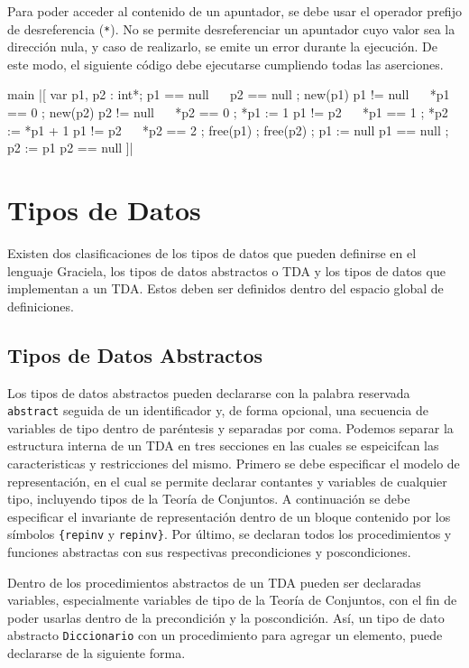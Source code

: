 Para poder acceder al contenido de un apuntador, se debe usar el operador
prefijo de desreferencia (\texttt{*}). No se permite desreferenciar un
apuntador cuyo valor sea la dirección nula, y caso de realizarlo, se emite un
error durante la ejecución. De este modo, el siguiente código debe ejecutarse
cumpliendo todas las aserciones.

\begin{gracielacode}
main
|[ var p1, p2 : int*; { p1 == null ~\Land~ p2 == null }
 ; new(p1)            { p1 != null ~\Land~ *p1 == 0 }
 ; new(p2)            { p2 != null ~\Land~ *p2 == 0 }
 ; *p1 := 1           { p1 != p2 ~\Land~ *p1 == 1 }
 ; *p2 := *p1 + 1     { p1 != p2 ~\Land~ *p2 == 2 }
 ; free(p1)
 ; free(p2)
 ; p1 := null         { p1 == null }
 ; p2 := p1           { p2 == null }
]|
\end{gracielacode}

\section{Tipos de Datos}
Existen dos clasificaciones de los tipos de datos que pueden definirse en el
lenguaje Graciela, los tipos de datos abstractos o TDA y los tipos de datos
que implementan a un TDA. Estos deben ser definidos dentro del espacio global
de definiciones.

\subsection{Tipos de Datos Abstractos}

Los tipos de datos abstractos pueden declararse con la palabra reservada
\texttt{abstract} seguida de un identificador y, de forma opcional, una
secuencia de variables de tipo dentro de paréntesis y separadas por coma.
Podemos separar la estructura interna de un TDA en tres secciones en las cuales
se espeicifcan las caracteristicas y restricciones del mismo. Primero se debe
especificar el modelo de representación, en el cual se permite declarar
contantes y variables de cualquier tipo, incluyendo tipos de la Teoría de
Conjuntos. A continuación se debe especificar el invariante de representación
dentro de un bloque contenido por los símbolos \texttt{\{repinv} y
\texttt{repinv\}}. Por último, se declaran todos los procedimientos y
funciones abstractas con sus respectivas precondiciones y poscondiciones.

Dentro de los procedimientos abstractos de un TDA pueden ser declaradas
variables, especialmente variables de tipo de la Teoría de Conjuntos, con el
fin de poder usarlas dentro de la precondición y la poscondición. Así, un tipo
de dato abstracto \texttt{Diccionario} con un procedimiento para agregar un
elemento, puede declararse de la siguiente forma.

